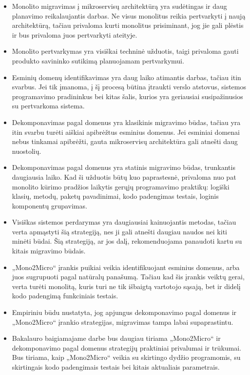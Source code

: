 \documentclass[fleqn]{VUMIFPSkursinis}
\begin{document}
\begin{itemize}
    \item Monolito migravimas į mikroservisų architektūrą yra sudėtingas ir daug planavimo reikalaujantis darbas. Ne visus monolitus reikia pertvarkyti į naują architektūrą, tačiau privaloma kurti monolitus prisiminant, jog jie gali plėstis ir bus privaloma juos pertvarkyti ateityje.
    \item Monolito pertvarkymas yra visiškai techninė užduotis, taigi privaloma gauti produkto savininko sutikimą planuojamam pertvarkymui.
    \item Esminių domenų identifikavimas yra daug laiko atimantis darbas, tačiau itin svarbus. Jei tik įmanoma, į šį procesą būtina įtraukti verslo atstovus, sistemos programavimo pradininkus bei kitas šalis, kurios yra geriausiai susipažinusios su pertvarkoma sistema.
    \item Dekomponavimas pagal domenus yra klasikinis migravimo būdas, tačiau yra itin svarbu turėti aiškiai apibrėžtus esminius domenus. Jei esminiai domenai nebus tinkamai apibrėžti, gauta mikroservisų architektūra gali atnešti daug nuostolių.
    \item Dekomponavimas pagal domenus yra statinis migravimo būdas, trunkantis daugiausia laiko. Kad ši užduotis būtų kuo paprastesnė, privaloma nuo pat monolito kūrimo pradžios laikytis gerųjų programavimo praktikų: logiški klasių, metodų, paketų pavadinimai, kodo padengimas testais, loginis komponentų grupavimas.
    \item Visiškas sistemos perdarymas yra daugiausiai kainuojantis metodas, tačiau verta apmąstyti šią strategiją, nes ji gali atnešti daugiau naudos nei kiti minėti būdai. Šią strategiją, ar jos dalį, rekomenduojama panaudoti kartu su kitais migravimo būdais.
    \item „Mono2Micro“ įrankis puikiai veikia identifikuojant esminius domenus, arba juos sugrupuoti pagal natūralų panašumą. Tačiau kad šis įrankis veiktų gerai, verta turėti monolitą, kuris turi ne tik išbaigtą vartotojo sąsają, bet ir didelį kodo padengimą funkciniais testais.
    \item Empiriniu būdu nustatyta, jog apjungus dekomponavimo pagal domenus ir „Mono2Micro“ įrankio strategijas, migravimas tampa labai supaprastintu.
    \item Bakalauro baigiamajame darbe bus daugiau tiriama „Mono2Micro“ ir dekomponavimo pagal domenus strategijų praktiniai privalumai ir trūkumai. Bus tiriama, kaip „Mono2Micro“ veikia su skirtingo dydžio programomis, su skirtingais kodo padengimais testais bei kitais aktualiais parametrais.
\end{itemize}

\printbibliography[heading=bibintoc]  %
\end{document}
